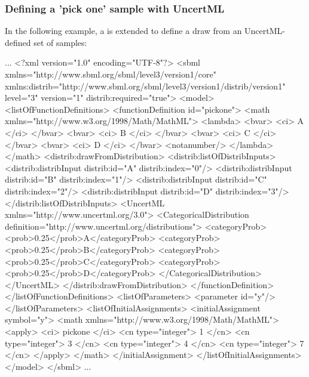 \documentclass[draftspec]{sbmlpkgspec}
\begin{document}
\subsubsection{Defining a 'pick one' sample with UncertML}
In the following example, a \FunctionDefinition is extended to define a draw from an UncertML-defined set of samples:

\begin{example}
...
<?xml version="1.0" encoding="UTF-8"?>
<sbml xmlns="http://www.sbml.org/sbml/level3/version1/core"
      xmlns:distrib="http://www.sbml.org/sbml/level3/version1/distrib/version1"
      level="3" version="1" distrib:required="true">
  <model>
    <listOfFunctionDefinitions>
      <functionDefinition id="pickone">
        <math xmlns="http://www.w3.org/1998/Math/MathML">
          <lambda>
            <bvar>
              <ci> A </ci>
            </bvar>
            <bvar>
              <ci> B </ci>
            </bvar>
            <bvar>
              <ci> C </ci>
            </bvar>
            <bvar>
              <ci> D </ci>
            </bvar>
            <notanumber/>
          </lambda>
        </math>
        <distrib:drawFromDistribution>
          <distrib:listOfDistribInputs>
            <distrib:distribInput distrib:id="A" distrib:index="0"/>
            <distrib:distribInput distrib:id="B" distrib:index="1"/>
            <distrib:distribInput distrib:id="C" distrib:index="2"/>
            <distrib:distribInput distrib:id="D" distrib:index="3"/>
          </distrib:listOfDistribInputs>
          <UncertML xmlns="http://www.uncertml.org/3.0">
            <CategoricalDistribution definition="http://www.uncertml.org/distributions">
              <categoryProb>
                <prob>0.25</prob>A</categoryProb>
              <categoryProb>
                <prob>0.25</prob>B</categoryProb>
              <categoryProb>
                <prob>0.25</prob>C</categoryProb>
              <categoryProb>
                <prob>0.25</prob>D</categoryProb>
            </CategoricalDistribution>
          </UncertML>
        </distrib:drawFromDistribution>
      </functionDefinition>
    </listOfFunctionDefinitions>
    <listOfParameters>
      <parameter id="y"/>
    </listOfParameters>
    <listOfInitialAssignments>
      <initialAssignment symbol="y">
        <math xmlns="http://www.w3.org/1998/Math/MathML">
          <apply>
            <ci> pickone </ci>
            <cn type="integer"> 1 </cn>
            <cn type="integer"> 3 </cn>
            <cn type="integer"> 4 </cn>
            <cn type="integer"> 7 </cn>
          </apply>
        </math>
      </initialAssignment>
    </listOfInitialAssignments>
  </model>
</sbml>
...
\end{example}
\end{document}
